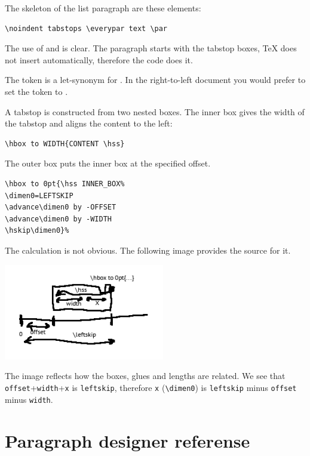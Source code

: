 \documentclass[]{ltugboat}
\begin{document}
The skeleton of the list paragraph are these elements:

\begin{verbatim}
\noindent tabstops \everypar text \par
\end{verbatim}

The use of  and  is clear. The paragraph starts with the tabstop boxes, \TeX{} does not insert  automatically, therefore the code does it.

The token  is a let-synonym for . In the right-to-left document you would prefer to set the token to .

A tabstop is constructed from two nested boxes. The inner box gives the width of the tabstop and aligns the content to the left:

\begin{verbatim}
\hbox to WIDTH{CONTENT \hss}
\end{verbatim}

The outer box puts the inner box at the specified offset.

\begin{verbatim}
\hbox to 0pt{\hss INNER_BOX%
\dimen0=LEFTSKIP
\advance\dimen0 by -OFFSET
\advance\dimen0 by -WIDTH
\hskip\dimen0}%
\end{verbatim}

The calculation is not obvious. The following image provides the source for it.

\includegraphics[width=7cm]{calculations.png}

The image reflects how the boxes, glues and lengths are related. We see that \verb|offset|+\verb|width|+\verb|x| is \verb|leftskip|, therefore \verb|x| (\verb|\dimen0|) is \verb|leftskip| minus \verb|offset| minus \verb|width|.


\section{Paragraph designer referense}
\end{document}
